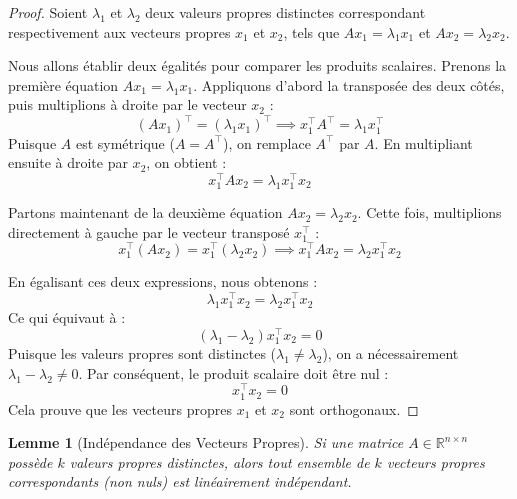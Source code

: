 \documentclass[12pt]{report}
\newtheorem{lemma}[theorem]{Lemme}
\begin{document}
\begin{proof}
    Soient $\lambda_1$ et $\lambda_2$ deux valeurs propres distinctes correspondant respectivement aux vecteurs propres $x_1$ et $x_2$, tels que $Ax_1 = \lambda_1 x_1$ et $Ax_2 = \lambda_2 x_2$.

    \noindent Nous allons établir deux égalités pour comparer les produits scalaires.
    \noindent Prenons la première équation $Ax_1 = \lambda_1 x_1$. Appliquons d'abord la transposée des deux côtés, puis multiplions à droite par le vecteur $x_2$ :
    \[
        (A x_1)^\top = (\lambda_1 x_1)^\top \implies x_1^\top A^\top = \lambda_1 x_1^\top
    \]
    Puisque $A$ est symétrique ($A = A^\top$), on remplace $A^\top$ par $A$. En multipliant ensuite à droite par $x_2$, on obtient :
    \[
        x_1^\top A x_2 = \lambda_1 x_1^\top x_2
    \]

    \noindent Partons maintenant de la deuxième équation $Ax_2 = \lambda_2 x_2$. Cette fois, multiplions directement à gauche par le vecteur transposé $x_1^\top$ :
    \[
        x_1^\top (A x_2) = x_1^\top (\lambda_2 x_2) \implies x_1^\top A x_2 = \lambda_2 x_1^\top x_2
    \]

    \noindent En égalisant ces deux expressions, nous obtenons :
    \[
        \lambda_1 x_1^\top x_2 = \lambda_2 x_1^\top x_2
    \]
    Ce qui équivaut à :
    \[
        (\lambda_1 - \lambda_2) x_1^\top x_2 = 0
    \]
    Puisque les valeurs propres sont distinctes ($\lambda_1 \neq \lambda_2$), on a nécessairement $\lambda_1 - \lambda_2 \neq 0$. Par conséquent, le produit scalaire doit être nul :
    \[
        x_1^\top x_2 = 0
    \]
    Cela prouve que les vecteurs propres $x_1$ et $x_2$ sont orthogonaux.
\end{proof}

\begin{lemma}[Indépendance des Vecteurs Propres]
    Si une matrice $A \in \mathbb{R}^{n \times n}$ possède $k$ valeurs propres distinctes, alors tout ensemble de $k$ vecteurs propres correspondants (non nuls) est linéairement indépendant.
\end{lemma}
\end{document}
